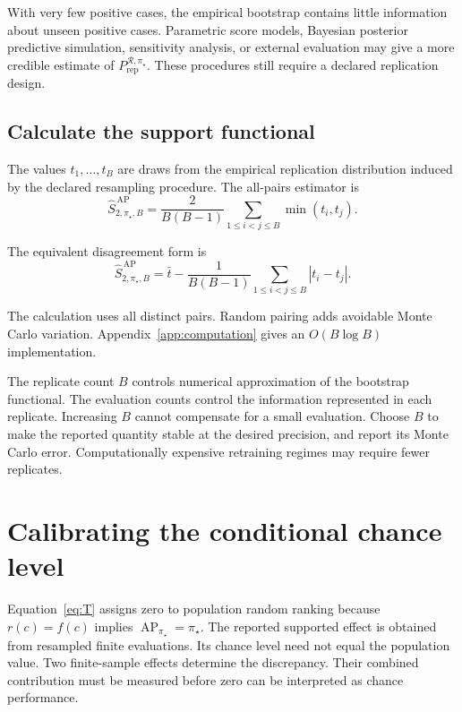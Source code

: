 \documentclass[11pt]{article}
\newcommand{\AP}{\operatorname{AP}}
\newcommand{\Regime}{\mathcal{R}}
\newcommand{\SAPHatB}{\widehat S_{2,\pi_\star,B}^{\,\mathrm{AP}}}
\newcommand{\PRep}{P_{\mathrm{rep}}^{\Regime,\pi_\star}}
\theoremstyle{remark}
\begin{document}
With very few positive cases, the empirical bootstrap contains little information about unseen positive cases. Parametric score models, Bayesian posterior predictive simulation, sensitivity analysis, or external evaluation may give a more credible estimate of $\PRep$. These procedures still require a declared replication design.

\subsection{Calculate the support functional}

The values $t_1,\ldots,t_B$ are draws from the empirical replication distribution induced by the declared resampling procedure. The all-pairs estimator is
\begin{equation}
\SAPHatB
=
\frac{2}{B(B-1)}
\sum_{1\leq i<j\leq B}
\min(t_i,t_j).
\label{eq:uestimator}
\end{equation}

The equivalent disagreement form is
\begin{equation}
\SAPHatB
=
\bar t
-
\frac{1}{B(B-1)}
\sum_{1\leq i<j\leq B}
|t_i-t_j|.
\label{eq:uestimator-disagreement}
\end{equation}

The calculation uses all distinct pairs. Random pairing adds avoidable Monte Carlo variation. Appendix~\ref{app:computation} gives an $O(B\log B)$ implementation.

The replicate count $B$ controls numerical approximation of the bootstrap functional. The evaluation counts control the information represented in each replicate. Increasing $B$ cannot compensate for a small evaluation. Choose $B$ to make the reported quantity stable at the desired precision, and report its Monte Carlo error. Computationally expensive retraining regimes may require fewer replicates.

\section{Calibrating the conditional chance level}
\label{sec:calibration}

Equation~\eqref{eq:T} assigns zero to population random ranking because $r(c)=f(c)$ implies $\AP_{\pi_\star}=\pi_\star$. The reported supported effect is obtained from resampled finite evaluations. Its chance level need not equal the population value. Two finite-sample effects determine the discrepancy. Their combined contribution must be measured before zero can be interpreted as chance performance.
\end{document}

